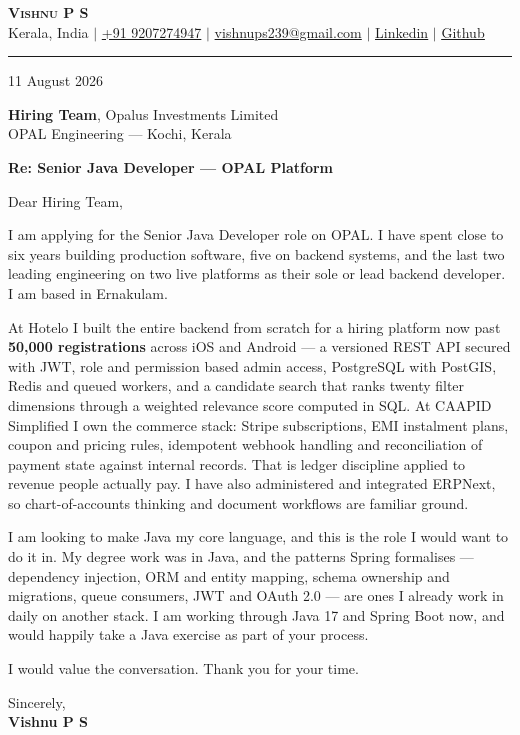 \documentclass[letterpaper,11pt]{article}
\begin{document}
\begin{center}
	\textbf{\huge \scshape Vishnu P S} \\ \vspace{4pt}
	Kerala, India $|$
	\href{tel:+919207274947}{+91 9207274947} $|$
	\href{mailto:vishnups239@gmail.com}{vishnups239@gmail.com} $|$
	\href{https://www.linkedin.com/in/vishnu-ps1}{\underline{Linkedin}} $|$
	\href{https://www.github.com/vishnupeas}{\underline{Github}}
\end{center}

\vspace{1pt}
\rule{\textwidth}{0.4pt}
\vspace{-2pt}

11 August 2026

\textbf{Hiring Team}, Opalus Investments Limited \\
OPAL Engineering --- Kochi, Kerala

\textbf{Re: Senior Java Developer --- OPAL Platform}

Dear Hiring Team,

I am applying for the Senior Java Developer role on OPAL. I have spent close to six years
building production software, five on backend systems, and the last two leading engineering
on two live platforms as their sole or lead backend developer. I am based in Ernakulam.

At Hotelo I built the entire backend from scratch for a hiring platform now past
\textbf{50,000 registrations} across iOS and Android --- a versioned REST API secured with
JWT, role and permission based admin access, PostgreSQL with PostGIS, Redis and queued
workers, and a candidate search that ranks twenty filter dimensions through a weighted
relevance score computed in SQL. At CAAPID Simplified I own the commerce stack: Stripe
subscriptions, EMI instalment plans, coupon and pricing rules, idempotent webhook handling
and reconciliation of payment state against internal records. That is ledger discipline
applied to revenue people actually pay. I have also administered and integrated ERPNext, so
chart-of-accounts thinking and document workflows are familiar ground.

I am looking to make Java my core language, and this is the role I would want to do it in.
My degree work was in Java, and the patterns Spring formalises --- dependency injection, ORM
and entity mapping, schema ownership and migrations, queue consumers, JWT and OAuth 2.0 ---
are ones I already work in daily on another stack. I am working through Java 17 and Spring
Boot now, and would happily take a Java exercise as part of your process.

I would value the conversation. Thank you for your time.

\vspace{2pt}
Sincerely, \\
\textbf{Vishnu P S}
\end{document}
